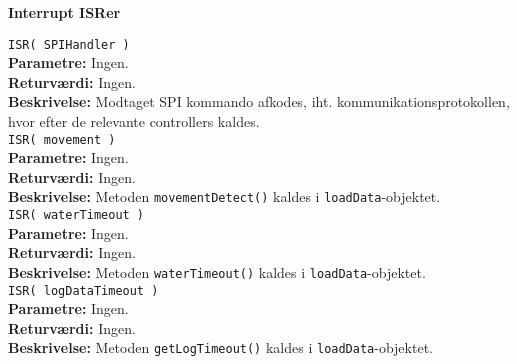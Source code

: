 
{\centering
\textbf{Interrupt ISRer}\par
}


\verb+ISR( SPIHandler ) +\\
\textbf{Parametre:} Ingen. \\
\textbf{Returværdi:} Ingen. \\
\textbf{Beskrivelse:} Modtaget SPI kommando afkodes, iht. kommunikationsprotokollen, hvor efter de relevante controllers kaldes.  \\

\verb+ISR( movement ) +\\
\textbf{Parametre:} Ingen. \\
\textbf{Returværdi:} Ingen. \\
\textbf{Beskrivelse:} Metoden \verb+movementDetect()+ kaldes i \verb+loadData+-objektet. \\

\verb+ISR( waterTimeout ) +\\
\textbf{Parametre:} Ingen. \\
\textbf{Returværdi:} Ingen. \\
\textbf{Beskrivelse:} Metoden \verb+waterTimeout()+ kaldes i \verb+loadData+-objektet. \\

\verb+ISR( logDataTimeout ) +\\
\textbf{Parametre:} Ingen. \\
\textbf{Returværdi:} Ingen. \\
\textbf{Beskrivelse:} Metoden \verb+getLogTimeout()+ kaldes i \verb+loadData+-objektet. \\
